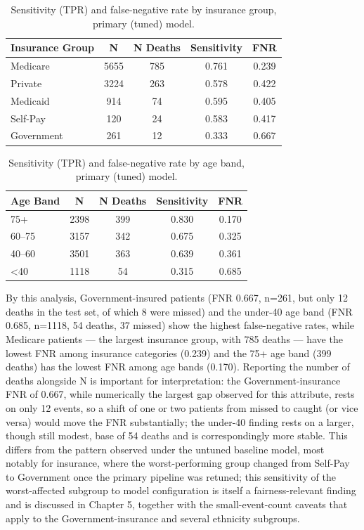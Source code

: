 \documentclass[12pt,a4paper]{report}
\begin{document}
\begin{table}[H]
\centering
\caption{Sensitivity (TPR) and false-negative rate by insurance group, primary (tuned) model.}
\label{tab:insurance-subgroups}
\small
\begin{tabular}{lcccc}
\toprule
Insurance Group & N & N Deaths & Sensitivity & FNR \\
\midrule
Medicare & 5655 & 785 & 0.761 & 0.239 \\
Private & 3224 & 263 & 0.578 & 0.422 \\
Medicaid & 914 & 74 & 0.595 & 0.405 \\
Self-Pay & 120 & 24 & 0.583 & 0.417 \\
Government & 261 & 12 & 0.333 & 0.667 \\
\bottomrule
\end{tabular}
\end{table}


\begin{table}[H]
\centering
\caption{Sensitivity (TPR) and false-negative rate by age band, primary (tuned) model.}
\label{tab:agebandsubgroups}
\small
\begin{tabular}{lcccc}
\toprule
Age Band & N & N Deaths & Sensitivity & FNR \\
\midrule
75+ & 2398 & 399 & 0.830 & 0.170 \\
60--75 & 3157 & 342 & 0.675 & 0.325 \\
40--60 & 3501 & 363 & 0.639 & 0.361 \\
\textless 40 & 1118 & 54 & 0.315 & 0.685 \\
\bottomrule
\end{tabular}
\end{table}


By this analysis, Government-insured patients (FNR 0.667, n=261, but only 12 deaths in the test set, of which 8 were missed) and the under-40 age band (FNR 0.685, n=1118, 54 deaths, 37 missed) show the highest false-negative rates, while Medicare patients --- the largest insurance group, with 785 deaths --- have the lowest FNR among insurance categories (0.239) and the 75+ age band (399 deaths) has the lowest FNR among age bands (0.170). Reporting the number of deaths alongside N is important for interpretation: the Government-insurance FNR of 0.667, while numerically the largest gap observed for this attribute, rests on only 12 events, so a shift of one or two patients from missed to caught (or vice versa) would move the FNR substantially; the under-40 finding rests on a larger, though still modest, base of 54 deaths and is correspondingly more stable. This differs from the pattern observed under the untuned baseline model, most notably for insurance, where the worst-performing group changed from Self-Pay to Government once the primary pipeline was retuned; this sensitivity of the worst-affected subgroup to model configuration is itself a fairness-relevant finding and is discussed in Chapter 5, together with the small-event-count caveats that apply to the Government-insurance and several ethnicity subgroups.
\end{document}
